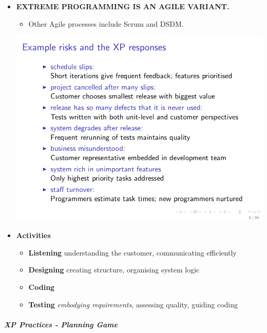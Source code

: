 \documentclass[a4paper]{article}
\providecommand{\tightlist}{%
  \setlength{\itemsep}{0pt}\setlength{\parskip}{0pt}}
\let\oldsubparagraph\subparagraph
\renewcommand{\subparagraph}[1]{\oldsubparagraph{#1}\mbox{}}
\begin{document}
\begin{itemize}
\item
  \textbf{EXTREME PROGRAMMING IS AN AGILE VARIANT.}

  \begin{itemize}
  \tightlist
  \item
    Other Agile processes include Scrum and DSDM.
  \end{itemize}

  \includegraphics{2C-SE.assets/1543147108484.png}
\item
  \textbf{Activities}

  \begin{itemize}
  \tightlist
  \item
    \textbf{Listening} understanding the customer, communicating
    efficiently
  \item
    \textbf{Designing} creating structure, organising system logic
  \item
    \textbf{Coding}
  \item
    \textbf{Testing} \emph{embodying requirements}, assessing quality,
    guiding coding
  \end{itemize}
\end{itemize}

\hypertarget{xp-practices---planning-game}{%
\subparagraph{XP Practices - Planning
Game}\label{xp-practices---planning-game}}
\end{document}
